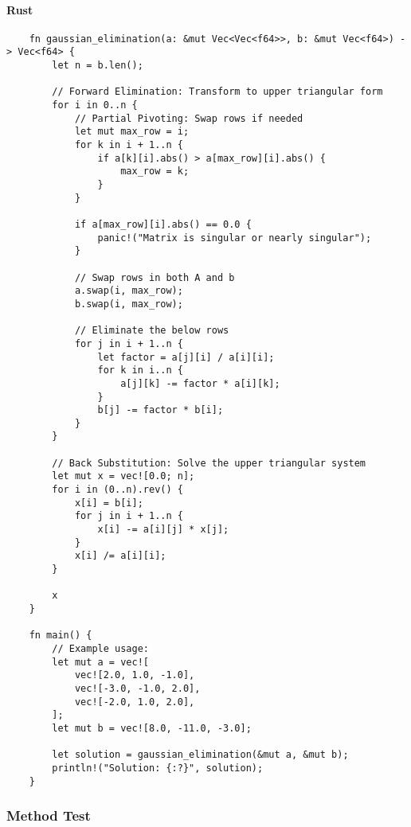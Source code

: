 \documentclass{article}
\begin{document}
            \paragraph{Rust}
                \begin{verbatim}
    fn gaussian_elimination(a: &mut Vec<Vec<f64>>, b: &mut Vec<f64>) -> Vec<f64> {
        let n = b.len();

        // Forward Elimination: Transform to upper triangular form
        for i in 0..n {
            // Partial Pivoting: Swap rows if needed
            let mut max_row = i;
            for k in i + 1..n {
                if a[k][i].abs() > a[max_row][i].abs() {
                    max_row = k;
                }
            }

            if a[max_row][i].abs() == 0.0 {
                panic!("Matrix is singular or nearly singular");
            }

            // Swap rows in both A and b
            a.swap(i, max_row);
            b.swap(i, max_row);

            // Eliminate the below rows
            for j in i + 1..n {
                let factor = a[j][i] / a[i][i];
                for k in i..n {
                    a[j][k] -= factor * a[i][k];
                }
                b[j] -= factor * b[i];
            }
        }

        // Back Substitution: Solve the upper triangular system
        let mut x = vec![0.0; n];
        for i in (0..n).rev() {
            x[i] = b[i];
            for j in i + 1..n {
                x[i] -= a[i][j] * x[j];
            }
            x[i] /= a[i][i];
        }

        x
    }

    fn main() {
        // Example usage:
        let mut a = vec![
            vec![2.0, 1.0, -1.0],
            vec![-3.0, -1.0, 2.0],
            vec![-2.0, 1.0, 2.0],
        ];
        let mut b = vec![8.0, -11.0, -3.0];

        let solution = gaussian_elimination(&mut a, &mut b);
        println!("Solution: {:?}", solution);
    }
                \end{verbatim}
        \subsubsection{Method Test}
\end{document}
